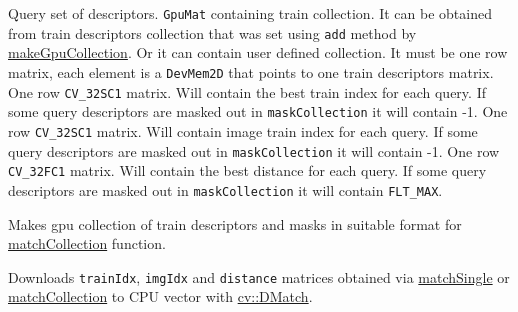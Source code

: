 \begin{description}
 {Query set of descriptors.}
 {\texttt{GpuMat} containing train collection. It can be obtained from train descriptors collection that was set using \texttt{add} method by \hyperref[cppfunc.gpu.BruteForceMatcher.makeGpuCollection]{makeGpuCollection}. Or it can contain user defined collection. It must be one row matrix, each element is a \texttt{DevMem2D} that points to one train descriptors matrix.}
 {One row \texttt{CV\_32SC1} matrix. Will contain the best train index for each query. If some query descriptors are masked out in \texttt{maskCollection} it will contain -1.}
 {One row \texttt{CV\_32SC1} matrix. Will contain image train index for each query. If some query descriptors are masked out in \texttt{maskCollection} it will contain -1.}
 {One row \texttt{CV\_32FC1} matrix. Will contain the best distance for each query. If some query descriptors are masked out in \texttt{maskCollection} it will contain \texttt{FLT\_MAX}.}
\end{description}


\label{cppfunc.gpu.BruteForceMatcher.makeGpuCollection}
Makes gpu collection of train descriptors and masks in suitable format for \hyperref[cppfunc.gpu.BruteForceMatcher.matchCollection]{matchCollection} function.



\label{cppfunc.gpu.BruteForceMatcher.matchDownload}
Downloads \texttt{trainIdx}, \texttt{imgIdx} and \texttt{distance} matrices obtained via \hyperref[cppfunc.gpu.BruteForceMatcher.matchSingle]{matchSingle} or \hyperref[cppfunc.gpu.BruteForceMatcher.matchCollection]{matchCollection} to CPU vector with \hyperref[cv.class.DMatch]{cv::DMatch}.



